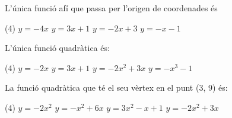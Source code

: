 \begin{autoaval}{38}
\begin{mylist}
\exer  L'única funció afí que passa per l'origen de coordenades és 
\begin{tasks}(4)
\task $y = -4x$
\task $y = 3x + 1 $
\task $y = -2x + 3$
\task $y = -x - 1$
\end{tasks}

\exer L'única funció quadràtica és:
\begin{tasks}(4)
\task $y = -2x$
\task $y = 3x + 1 $
\task $y = -2x^2 + 3x$
\task $y = -x^3 - 1$
\end{tasks}
 

\exer La funció quadràtica que té el seu vèrtex en el punt (3, 9) és:
\begin{tasks}(4)
	\task $y = -2x^{2}$
	\task $y = -x^{2} +6x$
	\task $y = 3x^{2}-x + 1$
	\task $y = -2x^{2} + 3x$
\end{tasks}
 

\end{mylist}
\end{autoaval}
